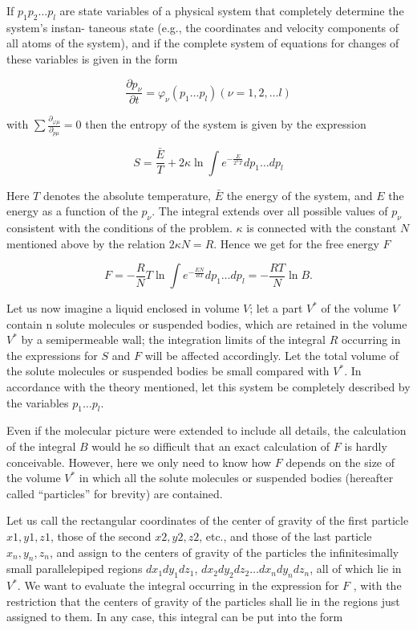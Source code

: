 \documentclass{article}
\begin{document}
If $p_{1}p_{2}\ldots p_{l}$ are state variables of a physical system that completely determine the system’s instan-
taneous state (e.g., the coordinates and velocity components of all atoms of the system), and if the
complete system of equations for changes of these variables is given in the form

\[\frac{\partial p_{\nu}}{\partial t}=\varphi_{\nu}(p_{1}\ldots p_{l}) (\nu=1,2,\ldots l)\]

with $\sum \frac{\partial _{\varphi\mu}}{\partial _{p \mu}}=0$ then the entropy of the system is given by the expression

\[ S = \frac{\bar{E}}{T} + 2\kappa \ln \int e^{- \frac{E}{2^{\kappa}T}} dp_{1} \ldots dp_{l} \]

Here $T$ denotes the absolute temperature, $\bar{E}$ the energy of the system, and $E$ the energy as a
function of the $p_{\nu}$. The integral extends over all possible values of $p_{\nu}$ consistent with the conditions of the problem. $\kappa$ is connected with the constant $N$ mentioned above by the relation $2\kappa N = R$. Hence we get for the free energy $F$

\[F= -\frac{R}{N}T \ln \int e^{- \frac{EN}{RT}}dp_{1} \ldots dp_{l} = - \frac{RT}{N} \ln B. \]

Let us now imagine a liquid enclosed in volume $V$; let a part $V^{*}$ of the volume $V$ contain n
solute molecules or suspended bodies, which are retained in the volume $V^{*}$ by a semipermeable
wall; the integration limits of the integral $R$ occurring in the expressions for $S$ and $F$ will be affected
accordingly. Let the total volume of the solute molecules or suspended bodies be small compared
with $V^{*}$. In accordance with the theory mentioned, let this system be completely described by the
variables $p_{1} \ldots p_{l}$.

Even if the molecular picture were extended to include all details, the calculation of the integral
$B$ would he so difficult that an exact calculation of $F$ is hardly conceivable. However, here we only
need to know how $F$ depends on the size of the volume $V^{*}$ in which all the solute molecules or
suspended bodies (hereafter called “particles” for brevity) are contained.

Let us call the rectangular coordinates of the center of gravity of the first particle $x1 , y1 , z1$, those
of the second $x2 , y2 , z2$, etc., and those of the last particle $x_{n}, y_{n}, z_{n}$, and assign to the centers of gravity of the particles the infinitesimally small parallelepiped regions $dx_{1}dy_{1}dz_{1}$,   $dx_{2}dy_{2}dz_{2} \ldots dx_{n}dy_{n}dz_{n}$,
all of which lie in $V^{*}$. We want to evaluate the integral occurring in the expression for $F$ , with the
restriction that the centers of gravity of the particles shall lie in the regions just assigned to them.
In any case, this integral can be put into the form
\end{document}
